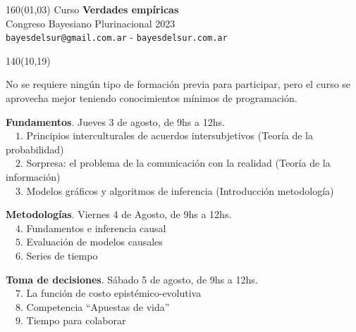 \documentclass[shownotes,aspectratio=169]{beamer}
\begin{document}
\begin{frame}

\begin{textblock}{160}(01,03)\centering
\textcolor{black!85}{{\large
\large Curso \textbf{Verdades empíricas} \\[-0.1cm] \footnotesize Congreso Bayesiano Plurinacional 2023}} \\ \scriptsize \texttt{bayesdelsur@gmail.com.ar} - \texttt{bayesdelsur.com.ar}
\end{textblock}



\begin{textblock}{140}(10,19)

\normalsize
 No se requiere ningún tipo de formación previa para participar, pero el curso se aprovecha mejor teniendo conocimientos mínimos de programación.

\vspace{0.3cm}

\normalsize \textbf{Fundamentos}. Jueves 3 de agosto, de 9hs a 12hs. \\[0.1cm] \footnotesize
\ \ $1$. Principios interculturales de acuerdos intersubjetivos (Teoría de la probabilidad) \\
\ \ $2$. Sorpresa: el problema de la comunicación con la realidad (Teoría de la información) \\
\ \ $3$. Modelos gráficos y algoritmos de inferencia (Introducción metodología)\\

 \vspace{0.3cm}

\normalsize \textbf{Metodologías}. Viernes 4 de Agosto, de 9hs a 12hs.\scriptsize  \\[0.1cm] \footnotesize
\ \ $4$. Fundamentos e inferencia causal \\
\ \ $5$. Evaluación de modelos causales \\
\ \ $6$. Series de tiempo \\

\vspace{0.3cm}

\normalsize \textbf{Toma de decisiones}. Sábado 5 de agosto, de 9hs a 12hs.\scriptsize  \\[0.1cm] \footnotesize
\ \ $7$. La función de costo epistémico-evolutiva\\
\ \ $8$. Competencia ``Apuestas de vida'' \\
\ \ $9$. Tiempo para colaborar

\end{textblock}

\end{frame}
\end{document}
